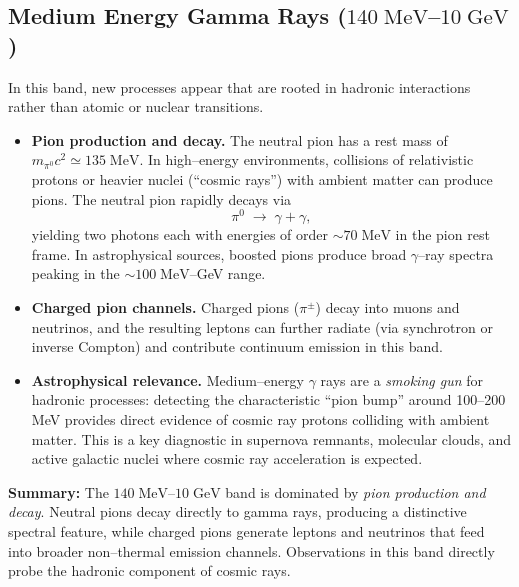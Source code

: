 \subsection{Medium Energy Gamma Rays ($140\;\mathrm{MeV}$--$10\;\mathrm{GeV}$)}

In this band, new processes appear that are rooted in hadronic
interactions rather than atomic or nuclear transitions.

\begin{itemize}
    \item \textbf{Pion production and decay.}  
    The neutral pion has a rest mass of $m_{\pi^0} c^2 \simeq
    135\;\mathrm{MeV}$. In high--energy environments, collisions of
    relativistic protons or heavier nuclei (``cosmic rays'') with
    ambient matter can produce pions. The neutral pion rapidly decays
    via
    \[
        \pi^0 \;\to\; \gamma + \gamma,
    \]
    yielding two photons each with energies of order
    $\sim 70\;\mathrm{MeV}$ in the pion rest frame. In astrophysical
    sources, boosted pions produce broad $\gamma$--ray spectra peaking
    in the $\sim 100\;\mathrm{MeV}$--GeV range.

    \item \textbf{Charged pion channels.}  
    Charged pions ($\pi^\pm$) decay into muons and neutrinos, and the
    resulting leptons can further radiate (via synchrotron or inverse
    Compton) and contribute continuum emission in this band.

    \item \textbf{Astrophysical relevance.}  
    Medium--energy $\gamma$ rays are a \emph{smoking gun} for hadronic
    processes: detecting the characteristic ``pion bump'' around
    100--200 MeV provides direct evidence of cosmic ray protons
    colliding with ambient matter. This is a key diagnostic in supernova
    remnants, molecular clouds, and active galactic nuclei where cosmic
    ray acceleration is expected.
\end{itemize}

\begin{remark}
    \textbf{Summary:} The $140\;\mathrm{MeV}$--$10\;\mathrm{GeV}$ band
    is dominated by \emph{pion production and decay}. Neutral pions
    decay directly to gamma rays, producing a distinctive spectral
    feature, while charged pions generate leptons and neutrinos that
    feed into broader non--thermal emission channels. Observations in
    this band directly probe the hadronic component of cosmic rays.
\end{remark}


